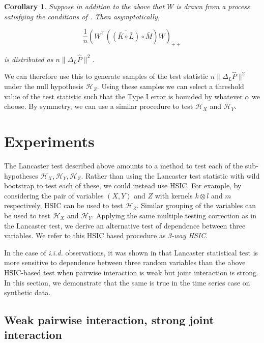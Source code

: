 \documentclass[]{article}
\newtheorem{corollary}{Corollary}
\begin{document}
\begin{corollary}
Suppose in addition to the above that $W$ is drawn from a process satisfying the conditions of \cite{leucht2013dependent}. Then asymptotically,

\[\frac{1}{n}\left(W^\intercal\left( \overline{\left( \bar{K} \circ \bar{L}\right) }\circ \bar{M} \right)W\right) _{++}\]

is distributed as $ n\| \Delta_L\hat{P} \|^2$. 
\end{corollary}

We can therefore use this to generate samples of the test statistic $ n\| \Delta_L\hat{P} \|^2$ under the null hypothesis $\mathcal{H}_Z$. Using these samples we can select a threshold value of the test statistic such that the Type I error is bounded by whatever $\alpha$ we choose. By symmetry, we can use a similar procedure to test $\mathcal{H}_X$ and $\mathcal{H}_Y$.



\section{Experiments}

The Lancaster test described above amounts to a method to test each of the sub-hypotheses $\mathcal{H}_X, \mathcal{H}_Y, \mathcal{H}_Z$. Rather than using the Lancaster test statistic with wild bootstrap to test each of these, we could instead use HSIC. For example, by considering the pair of variables $(X,Y)$ and $Z$ with kernels $k\otimes l$ and $m$ respectively, HSIC can be used to test $\mathcal{H}_Z$. Similar grouping of the variables can be used to test $\mathcal{H}_X$ and $\mathcal{H}_Y$. Applying the same multiple testing correction as in the Lancaster test, we derive an alternative test of dependence between three variables. We refer to this HSIC based procedure as \emph{3-way HSIC}.

In the case of \emph{i.i.d. } observations, it was shown in \cite{sejdinovic2013kernel} that Lancaster statistical test is more sensitive to dependence between three random variables than the above HSIC-based test when pairwise interaction is weak but joint interaction is strong. In this section, we demonstrate that the same is true in the time series case on synthetic data.




\subsection{Weak pairwise interaction, strong joint interaction}\label{experiment1}
\end{document}
